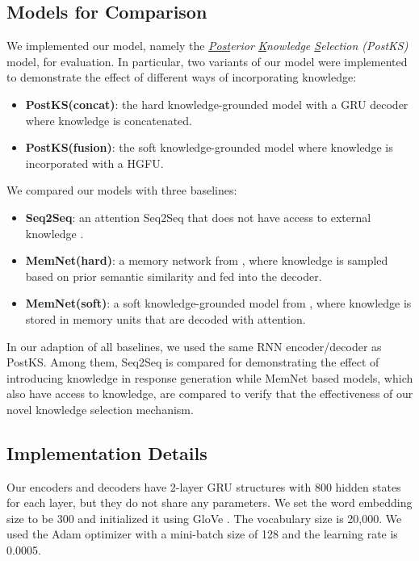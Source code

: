 \documentclass{article}
\begin{document}
\subsection{Models for Comparison}
We implemented our model, namely the \emph{\underline{Post}erior \underline{K}nowledge \underline{S}election (PostKS)} model, for evaluation. 
In particular, two variants of our model were implemented to demonstrate the effect of different ways of incorporating knowledge:
\begin{itemize}
    \item \textbf{PostKS(concat)}: the hard knowledge-grounded model with a GRU decoder where knowledge is concatenated.
    \item \textbf{PostKS(fusion)}: the soft knowledge-grounded model where knowledge is incorporated with a HGFU.
\end{itemize}

We compared our models with three baselines:
\begin{itemize}
    \item \textbf{Seq2Seq}: an attention Seq2Seq that does not have access to external knowledge  \cite{vinyals2015neural}. 
    \item \textbf{MemNet(hard)}: a memory network from \cite{ghazvininejad2018knowledge}, where knowledge is sampled based on prior semantic similarity and fed into the decoder.
    \item \textbf{MemNet(soft)}: a soft knowledge-grounded model from \cite{ghazvininejad2018knowledge},
    where knowledge is stored in memory units that are decoded with attention.
\end{itemize}
In our adaption of all baselines, we used the same RNN encoder/decoder as PostKS.
Among them, Seq2Seq is compared for demonstrating the effect of introducing knowledge in response generation while
MemNet based models, which also have access to knowledge, are compared to verify that the effectiveness of our novel knowledge selection mechanism.

\subsection{Implementation Details}
Our encoders and decoders have 2-layer GRU structures with 800 hidden states for each layer,
but they do not share any parameters.
We set 
the word embedding size to be 300 and 
initialized it using GloVe \cite{pennington2014glove}.
The vocabulary size is 20,000.
We used the Adam optimizer with a mini-batch size of 128 and
the learning rate is 0.0005.
\end{document}
